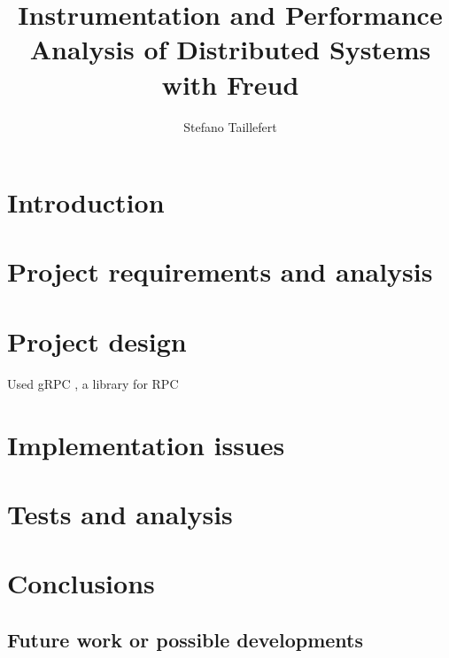 \documentclass[]{usiinfbachelorproject}
\author{Stefano Taillefert}
\title{Instrumentation and Performance Analysis of Distributed Systems with Freud}
\begin{document}
\maketitle


\section{Introduction} 

	

\section{Project requirements and analysis}

	

\section{Project design}

	Used gRPC \cite{gRPCdocs}, a library for RPC

\section{Implementation issues}

	

\section{Tests and analysis}

	

\section{Conclusions}

	

	\subsection{Future work or possible developments}

		



\end{document}
